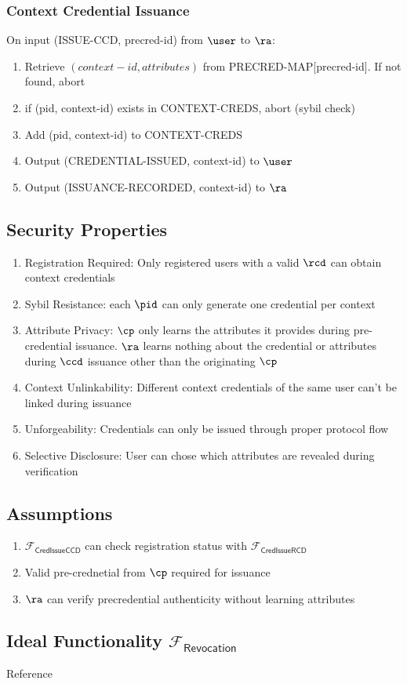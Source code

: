\subsubsection{Context Credential Issuance}
On input (ISSUE-CCD, precred-id) from $\user$ to $\ra$:
\begin{enumerate}
    \item Retrieve $(context-id, attributes)$ from PRECRED-MAP[precred-id]. If not found, abort
    \item if (pid, context-id) exists in CONTEXT-CREDS, abort (sybil check)
    \item Add (pid, context-id) to CONTEXT-CREDS
    \item Output (CREDENTIAL-ISSUED, context-id) to $\user$
    \item Output (ISSUANCE-RECORDED, context-id) to $\ra$
\end{enumerate}

\subsection{Security Properties}
\begin{enumerate}
    \item Registration Required: Only registered users with a valid $\rcd$ can obtain context credentials
    \item Sybil Resistance: each $\pid$ can only generate one credential per context
    \item Attribute Privacy: $\cp$ only learns the attributes it provides during pre-credential issuance. $\ra$ learns nothing about the credential or attributes during $\ccd$ issuance other than the originating $\cp$
    \item Context Unlinkability: Different context credentials of the same user can't be linked during issuance
    \item Unforgeability: Credentials can only be issued through proper protocol flow
    \item Selective Disclosure: User can chose which attributes are revealed during verification
\end{enumerate}

\subsection{Assumptions}
\begin{enumerate}
    \item $\mathcal{F}_{\mathsf{CredIssueCCD}}$ can check registration status with $\mathcal{F}_{\mathsf{CredIssueRCD}}$
    \item Valid pre-crednetial from $\cp$ required for issuance
    \item $\ra$ can verify precredential authenticity without learning attributes
\end{enumerate}





\subsection{Ideal Functionality $\mathcal{F}_{\mathsf{Revocation}}$}
Reference \cite{robshaw_uc_2016, cheon_universal_2016}